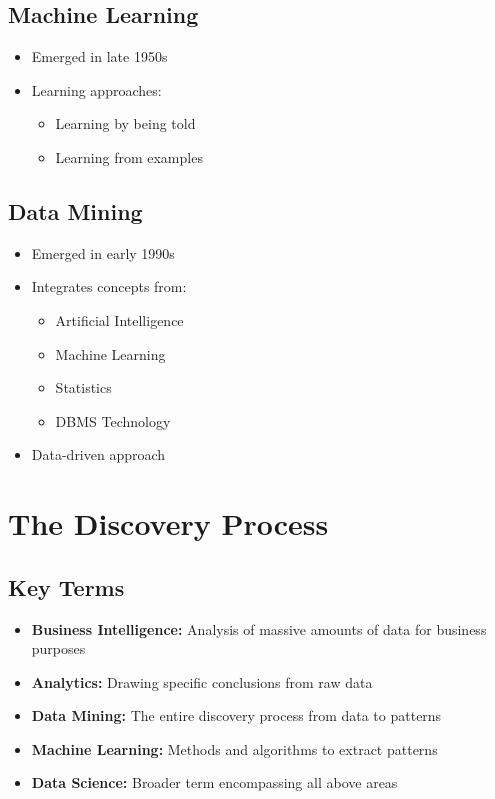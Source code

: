 \subsection{Machine Learning}
\begin{itemize}
    \item Emerged in late 1950s
    \item Learning approaches:
    \begin{itemize}
        \item Learning by being told
        \item Learning from examples
    \end{itemize}
\end{itemize}

\subsection{Data Mining}
\begin{itemize}
    \item Emerged in early 1990s
    \item Integrates concepts from:
    \begin{itemize}
        \item Artificial Intelligence
        \item Machine Learning
        \item Statistics
        \item DBMS Technology
    \end{itemize}
    \item Data-driven approach
\end{itemize}

\section{The Discovery Process}

\subsection{Key Terms}
\begin{itemize}
    \item \textbf{Business Intelligence:} Analysis of massive amounts of data for business purposes
    \item \textbf{Analytics:} Drawing specific conclusions from raw data
    \item \textbf{Data Mining:} The entire discovery process from data to patterns
    \item \textbf{Machine Learning:} Methods and algorithms to extract patterns
    \item \textbf{Data Science:} Broader term encompassing all above areas
\end{itemize}

